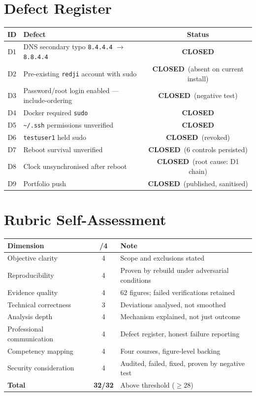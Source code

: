 \documentclass[11pt,a4paper]{article}
\newcommand{\closed}{\textcolor{okgreen}{\textbf{CLOSED}}}
\begin{document}
\section{Defect Register}
\begin{longtable}{@{}c p{6.6cm} c@{}}
\toprule
\textbf{ID} & \textbf{Defect} & \textbf{Status}\\
\midrule\endhead
D1 & DNS secondary typo \texttt{8.4.4.4} $\rightarrow$ \texttt{8.8.4.4} & \closed\\
D2 & Pre-existing \texttt{redji} account with sudo & \closed\ (absent on current install)\\
D3 & Password/root login enabled — include-ordering & \closed\ (negative test)\\
D4 & Docker required \texttt{sudo} & \closed\\
D5 & \texttt{\~{}/.ssh} permissions unverified & \closed\\
D6 & \texttt{testuser1} held sudo & \closed\ (revoked)\\
D7 & Reboot survival unverified & \closed\ (6 controls persisted)\\
D8 & Clock unsynchronised after reboot & \closed\ (root cause: D1 chain)\\
D9 & Portfolio push & \closed\ (published, sanitised)\\
\bottomrule
\end{longtable}

\section{Rubric Self-Assessment}
\begin{longtable}{@{}p{5.6cm} c p{4.4cm}@{}}
\toprule
\textbf{Dimension} & \textbf{/4} & \textbf{Note}\\
\midrule\endhead
Objective clarity          & 4 & Scope and exclusions stated\\
Reproducibility            & 4 & Proven by rebuild under adversarial conditions\\
Evidence quality           & 4 & 62 figures; failed verifications retained\\
Technical correctness      & 3 & Deviations analysed, not smoothed\\
Analysis depth             & 4 & Mechanism explained, not just outcome\\
Professional communication & 4 & Defect register, honest failure reporting\\
Competency mapping         & 4 & Four courses, figure-level backing\\
Security consideration     & 4 & Audited, failed, fixed, proven by negative test\\
\midrule
\textbf{Total} & \textbf{32/32} & Above threshold ($\geq$28)\\
\bottomrule
\end{longtable}
\end{document}
